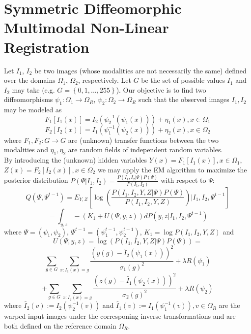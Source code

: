 \documentclass[11pt]{article}
\begin{document}
\section{Symmetric Diffeomorphic Multimodal Non-Linear Registration}
Let $I_1$, $I_2$ be two images (whose modalities are not necessarily the same) defined over the domains $\Omega_{1}$, $\Omega_{2}$, respectively. Let $G$ be the set of possible values $I_1$ and $I_2$ may take (e.g. $G=\left\lbrace 0,1,...,255\right\rbrace$). Our objective is to find two diffeomorphisms $\psi_{1}:\Omega_{1}\rightarrow \Omega_{R}$, $\psi_{2}:\Omega_{2}\rightarrow \Omega_{R}$ such that the observed images $I_{1}, I_{2}$ may be modeled as
\begin{equation}
	F_{1}[I_{1}(x)] = I_{2}(\psi_{2}^{-1}(\psi_{1}(x))) + \eta_{1}(x), x\in\Omega_{1}
\end{equation}
\begin{equation}
	F_{2}[I_{2}(x)] = I_{1}(\psi_{1}^{-1}(\psi_{2}(x))) + \eta_{2}(x), x\in\Omega_{2}
\end{equation}
where $F_{1}, F_{2}:G \rightarrow G$ are (unknown) transfer functions between the two modalities and $\eta_{1}, \eta_{2}$ are random fields of independent random variables.\\

By introducing the (unknown) hidden variables $Y(x)=F_{1}[I_{1}(x)], x\in \Omega_{1}$, $Z(x)=F_{2}[I_{2}(x)], x\in \Omega_{2}$ we may apply the EM algorithm to maximize the posterior distribution $P(\Psi | I_{1}, I_{2}) = \frac{P(I_{1}, I_{2} | \Psi)P(\Psi)}{P(I_{1}, I_{2})}$ with respect to $\Psi$:
\begin{equation}
	Q(\Psi, \Psi^{t-1}) = E_{Y,Z}\left[\log \left( \frac{P(I_{1}, I_{2}, Y, Z|\Psi)P(\Psi)}{P(I_{1}, I_{2}, Y, Z)}\right) | I_{1}, I_{2}, \Psi^{t-1}\right]
\end{equation}
\begin{equation}
=\int_{y,z} -(K_1 + U(\Psi, y, z))dP(y,z| I_{1}, I_{2}, \Psi^{t-1})
\end{equation}
where $\Psi = (\psi_{1}, \psi_{2})$, $\Psi^{t-1} = (\psi_{1}^{t-1}, \psi_{2}^{t-1})$, $K_{1} =\log P(I_{1}, I_{2}, Y, Z)$  and
\begin{equation}
	U(\Psi, y, z) = \log \left(P(I_{1}, I_{2}, Y, Z|\Psi)P(\Psi)\right)=
\end{equation}
\begin{equation}
	\sum_{g\in G} \sum_{x : I_{1}(x) = g} \frac{\left(y(g) - \tilde{I_{2}}(\psi_{1}(x))\right)^{2}}{\sigma_{1}(g)^{2}} + \lambda R(\psi_{1})
\end{equation}
\begin{equation}
	+\sum_{g\in G} \sum_{x : I_{2}(x) = g} \frac{\left(z(g) - \tilde{I_{1}}(\psi_{2}(x))\right)^{2}}{\sigma_{2}(g)^{2}} + \lambda R(\psi_{2})
\end{equation}
where $\tilde{I_{2}}(v) := I_{2}(\psi_{2}^{-1}(v))$ and $\tilde{I_{1}}(v) := I_{1}(\psi_{1}^{-1}(v)), v\in \Omega_{R}$ are the warped input images under the corresponing inverse transformations and are both defined on the reference domain $\Omega_{R}$.\\
\end{document}
